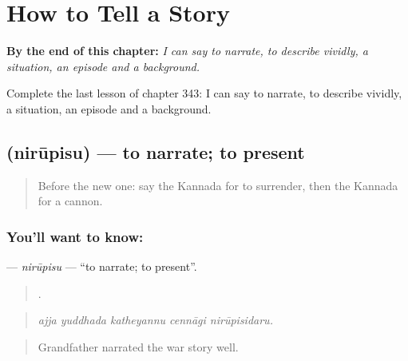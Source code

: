 
\chapter{How to Tell a Story}
\label{ch:ka-how-to-tell-a-story}

\begin{chapteropening}
\textbf{By the end of this chapter:} \emph{I can say to narrate, to describe vividly, a situation, an episode and a background.}

Complete the last lesson of chapter 343: I can say to narrate, to describe vividly, a situation, an episode and a background.
\end{chapteropening}

\section[\texorpdfstring{\kn{ನಿರೂಪಿಸು} (nirūpisu)}{ನಿರೂಪಿಸು (nirūpisu)}]{ (nirūpisu) — to narrate; to present}

\label{lesson:KA-C343-nirupisu}



\begin{quote}
Before the new one: say the Kannada for to surrender, then the Kannada for a cannon.
\end{quote}

\subsection*{You'll want to know: }
\textbf{} — \emph{nirūpisu} — \textquotedblleft{}to narrate; to present\textquotedblright{}.

\begin{quote}
    .
\end{quote}

\begin{quote}
\emph{ajja yuddhada katheyannu cennāgi nirūpisidaru.}
\end{quote}

\begin{quote}
Grandfather narrated the war story well.
\end{quote}

